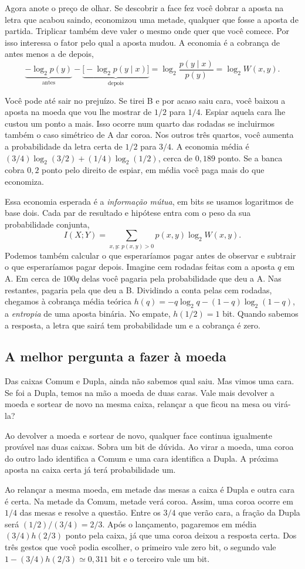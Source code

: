 \documentclass[12pt,oneside]{article}
\newcommand{\secao}[1]{\Needspace{5.2\baselineskip}\subsection*{#1}}
\newcommand{\bookanchor}[1]{\phantomsection\label{#1}}
\begin{document}
Agora anote o preço de olhar. Se descobrir a face fez você dobrar a aposta na letra que acabou saindo, economizou uma metade, qualquer que fosse a aposta de partida. Triplicar também deve valer o mesmo onde quer que você comece. Por isso interessa o fator pelo qual a aposta mudou. A economia é a cobrança de antes menos a de depois,
\[
 \underbrace{-\log_2 p(y)}_{\text{antes}}
 -\underbrace{\big[-\log_2 p(y\mid x)\big]}_{\text{depois}}
 =\log_2\frac{p(y\mid x)}{p(y)}=\log_2 W(x,y).
\]

Você pode até sair no prejuízo. Se tirei B e por acaso saiu cara, você baixou a aposta na moeda que vou lhe mostrar de $1/2$ para $1/4$. Espiar aquela cara lhe custou um ponto a mais. Isso ocorre num quarto das rodadas se incluirmos também o caso simétrico de A dar coroa. Nos outros três quartos, você aumenta a probabilidade da letra certa de $1/2$ para $3/4$. A economia média é $(3/4)\log_2(3/2)+(1/4)\log_2(1/2)$, cerca de $0{,}189$ ponto. Se a banca cobra $0{,}2$ ponto pelo direito de espiar, em média você paga mais do que economiza.

Essa\bookanchor{topic-02-2} economia esperada é a \emph{informação mútua}, em bits se usamos logaritmos de base dois. Cada par de resultado e hipótese entra com o peso da sua probabilidade conjunta,
\[
 I(X;Y)=\sum_{x,y:\,p(x,y)>0}p(x,y)\log_2 W(x,y).
\]
Podemos\bookanchor{topic-02-4} também calcular o que esperaríamos pagar antes de observar e subtrair o que esperaríamos pagar depois. Imagine cem rodadas feitas com a aposta $q$ em A. Em cerca de $100q$ delas você pagaria pela probabilidade que deu a A. Nas restantes, pagaria pela que deu a B. Dividindo a conta pelas cem rodadas, chegamos à cobrança média teórica $h(q)=-q\log_2 q-(1-q)\log_2(1-q)$, a \emph{entropia} de uma aposta binária. No empate, $h(1/2)=1$ bit. Quando sabemos a resposta, a letra que sairá tem probabilidade um e a cobrança é zero.

\secao{A melhor pergunta a fazer à moeda}
Das caixas Comum e Dupla, ainda não sabemos qual saiu. Mas vimos uma cara. Se foi a Dupla, temos na mão a moeda de duas caras. Vale mais devolver a moeda e sortear de novo na mesma caixa, relançar a que ficou na mesa ou virá-la?

Ao devolver a moeda e sortear de novo, qualquer face continua igualmente provável nas duas caixas. Sobra um bit de dúvida. Ao virar a moeda, uma coroa do outro lado identifica a Comum e uma cara identifica a Dupla. A próxima aposta na caixa certa já terá probabilidade um.

Ao relançar a mesma moeda, em metade das mesas a caixa é Dupla e outra cara é certa. Na metade da Comum, metade verá coroa. Assim, uma coroa ocorre em $1/4$ das mesas e resolve a questão. Entre os $3/4$ que verão cara, a fração da Dupla será $(1/2)/(3/4)=2/3$. Após o lançamento, pagaremos em média $(3/4)h(2/3)$ ponto pela caixa, já que uma coroa deixou a resposta certa. Dos três gestos que você podia escolher, o primeiro vale zero bit, o segundo vale $1-(3/4)h(2/3)\simeq0{,}311$ bit e o terceiro vale um bit.
\end{document}

